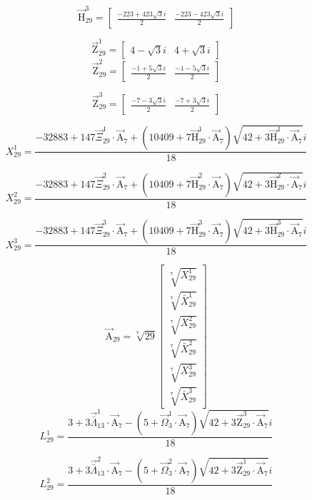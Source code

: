 \documentclass{article}
\begin{document}
\begin{enumerate}
\[ \vec{\mathrm{H}}_{29}^{3}=\left[ \begin{matrix} \frac{-223+423\sqrt{3}i}{2} & \frac{-223-423\sqrt{3}i}{2} \end{matrix} \right] \]

\[ \vec{\mathrm{Z}}_{29}^{1}=\left[ \begin{matrix} 4-\sqrt{3}i & 4+\sqrt{3}i \end{matrix} \right] \]
\[ \vec{\mathrm{Z}}_{29}^{2}=\left[ \begin{matrix} \frac{-1+5\sqrt{3}i}{2} & \frac{-1-5\sqrt{3}i}{2} \end{matrix} \right] \]

\[ \vec{\mathrm{Z}}_{29}^{3}=\left[ \begin{matrix} \frac{-7-3\sqrt{3}i}{2} & \frac{-7+3\sqrt{3}i}{2} \end{matrix} \right] \]

\[ X_{29}^{1}=\frac{-32883+147\vec{\Xi}_{29}^{1}\cdot\vec{\mathrm{A}}_{7}+\left( 10409+7\vec{\mathrm{H}}_{29}^{1}\cdot\vec{\mathrm{A}}_{7} \right)\sqrt{42+3\vec{\mathrm{H}}_{29}^{1}\cdot\vec{\mathrm{A}}_{7}}i}{18} \]

\[ X_{29}^{2}=\frac{-32883+147\vec{\Xi}_{29}^{2}\cdot\vec{\mathrm{A}}_{7}+\left( 10409+7\vec{\mathrm{H}}_{29}^{2}\cdot\vec{\mathrm{A}}_{7} \right)\sqrt{42+3\vec{\mathrm{H}}_{29}^{2}\cdot\vec{\mathrm{A}}_{7}}i}{18} \]

\[ X_{29}^{3}=\frac{-32883+147\vec{\Xi}_{29}^{3}\cdot\vec{\mathrm{A}}_{7}+\left( 10409+7\vec{\mathrm{H}}_{29}^{3}\cdot\vec{\mathrm{A}}_{7} \right)\sqrt{42+3\vec{\mathrm{H}}_{29}^{3}\cdot\vec{\mathrm{A}}_{7}}i}{18} \]

\[ \vec{\mathrm{A}}_{29}=\sqrt[7]{29}\left[ \begin{matrix} \sqrt[7]{X_{29}^{1}} \\ \sqrt[7]{\bar{X}_{29}^{1}} \\ \sqrt[7]{X_{29}^{2}} \\ \sqrt[7]{\bar{X}_{29}^{2}} \\ \sqrt[7]{X_{29}^{3}} \\ \sqrt[7]{\bar{X}_{29}^{3}} \end{matrix} \right] \]
\[ L_{29}^{1}=\frac{3+3\vec{\bar{\Lambda}}_{13}^{1}\cdot\vec{\mathrm{A}}_{7}-\left( 5+\vec{\Omega}_{3}^{1}\cdot\vec{\mathrm{A}}_{7} \right)\sqrt{42+3\vec{\mathrm{Z}}_{29}^{3}\cdot\vec{\mathrm{A}}_{7}}i}{18} \]

\[ L_{29}^{2}=\frac{3+3\vec{\bar{\Lambda}}_{13}^{2}\cdot\vec{\mathrm{A}}_{7}-\left( 5+\vec{\Omega}_{3}^{2}\cdot\vec{\mathrm{A}}_{7} \right)\sqrt{42+3\vec{\mathrm{Z}}_{29}^{1}\cdot\vec{\mathrm{A}}_{7}}i}{18} \]


\end{enumerate}
\end{document}
